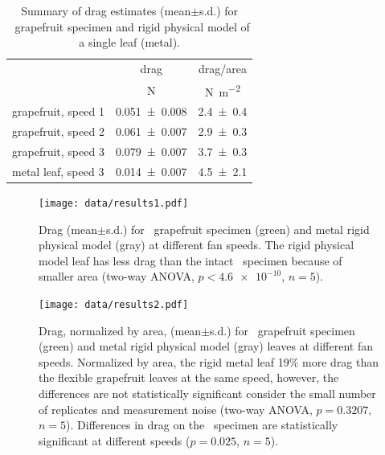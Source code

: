 \begin{table}
\caption{Summary of drag estimates (mean$\pm$s.d.) for \Cxparadisi\ grapefruit specimen and rigid physical model of a single leaf (metal).}
\label{tab:results:drag}
\begin{center}
\begin{tabular}{lcc} %
\toprule
& drag & drag/area \\
& \si{\newton} & \si{\newton\per\meter\squared} \\
\midrule
grapefruit, speed 1 & \num{0.051\pm0.008} & \num{2.4\pm0.4} \\
grapefruit, speed 2 & \num{0.061\pm0.007} & \num{2.9\pm0.3} \\
grapefruit, speed 3 & \num{0.079\pm0.007} & \num{3.7\pm0.3} \\
metal leaf, speed 3 & \num{0.014\pm0.007} & \num{4.5\pm2.1} \\
\bottomrule
\end{tabular}
\end{center}
\end{table}

\clearpage
\begin{figure}[p]
\begin{center}
\texttt{[image: data/results1.pdf]}
%
\end{center}
\caption{Drag (mean$\pm$s.d.) for \Cxparadisi\ grapefruit specimen (green) and metal rigid physical model (gray) at different fan speeds. The rigid physical model leaf has less drag than the intact \Cxparadisi\ specimen because of smaller area (two-way ANOVA, $p<\num{4.6e-10}$, $n=5$).}
\label{fig:results:drag}
\end{figure}

\begin{figure}[p]
\begin{center}
\texttt{[image: data/results2.pdf]}
%
\end{center}
\caption{Drag, normalized by area, (mean$\pm$s.d.) for \Cxparadisi\ grapefruit specimen (green) and metal rigid physical model (gray) leaves at different fan speeds. Normalized by area, the rigid metal leaf 19\% more drag than the flexible grapefruit leaves at the same speed, however, the differences are not statistically significant consider the small number of replicates and measurement noise (two-way ANOVA, $p=0.3207$, $n=5$). Differences in drag on the \Cxparadisi\ specimen are statistically significant at different speeds ($p=0.025$, $n=5$).}
\label{fig:results:dragarea}
\end{figure}

